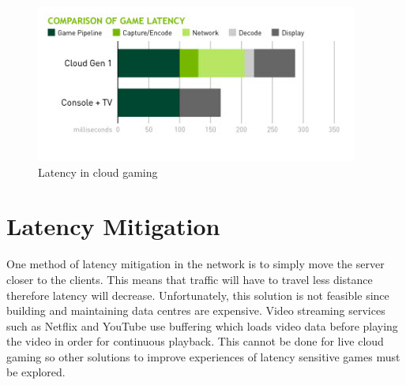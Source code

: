 \begin{figure}[h]
 \centering
 \includegraphics[width=0.8\linewidth]{images/latency.png}
 \caption{Latency in cloud gaming}
 \label{fig:latency}
\end{figure}

\section{Latency Mitigation}
One method of latency mitigation in the network is to simply move the server closer to the clients. This means that traffic will have to travel less distance therefore latency will decrease. Unfortunately, this solution is not feasible since building and maintaining data centres are expensive. Video streaming services such as Netflix and YouTube use buffering which loads video data before playing the video in order for continuous playback. This cannot be done for live cloud gaming so other solutions to improve experiences of latency sensitive games must be explored.

